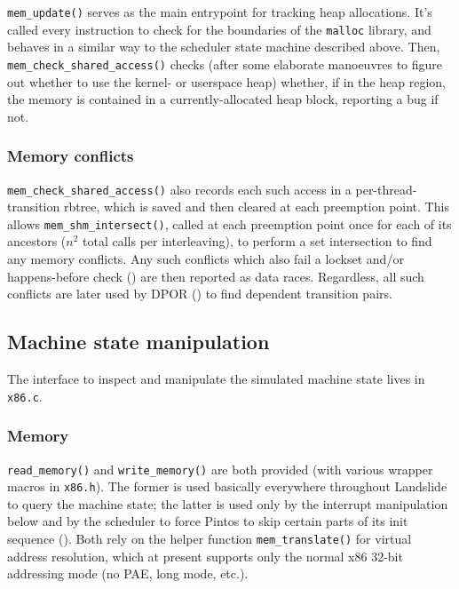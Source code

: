 {\tt mem\_update()} serves as the main entrypoint for tracking heap allocations.
It's called every instruction to check for the boundaries of the {\tt malloc} library,
and behaves in a similar way to the scheduler state machine described above.
Then, {\tt mem\_check\_shared\_access()} checks
(after some elaborate manoeuvres to figure out whether to use the kernel- or userspace heap)
whether, if in the heap region, the memory is contained in a currently-allocated heap block,
reporting a bug if not.

\subsubsection{Memory conflicts}

{\tt mem\_check\_shared\_access()} also records each such access in a per-thread-transition rbtree,
which is saved and then cleared at each preemption point.
This allows {\tt mem\_shm\_\allowbreak{}intersect()}, called at each preemption point once for each of its ancestors
($n^2$ total calls per interleaving),
to perform a set intersection to find any memory conflicts.
Any such conflicts which also fail a lockset
and/or happens-before check (\sect{\ref{sec:landslide-datarace}})
are then reported as data races.
Regardless, all such conflicts are later used by DPOR (\sect{\ref{sec:landslide-dpor}}) to find dependent transition pairs.


\subsection{Machine state manipulation}

The interface to inspect and manipulate the simulated machine state lives in {\tt x86.c}.

\subsubsection{Memory}

{\tt read\_memory()} and {\tt write\_memory()} are both provided (with various wrapper macros in {\tt x86.h}).
The former is used basically everywhere throughout Landslide to query the machine state;
the latter is used only by the interrupt manipulation below
and by the scheduler to force Pintos to skip certain parts of its init sequence (\sect{\ref{sec:landslide-pintosspecifics}}).
Both rely on the helper function {\tt mem\_translate()} for virtual address resolution,
which at present supports only the normal x86 32-bit addressing mode (no PAE, long mode, etc.).

